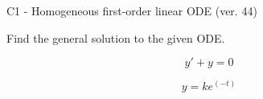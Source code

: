 \begin{exercise}
  \begin{exerciseTitle}C1 - Homogeneous first-order linear ODE (ver. 44)\end{exerciseTitle}
  \begin{exerciseStatement}
    
Find the general solution to the given ODE.

    
\[y'+y=0\]

  \end{exerciseStatement}
  \begin{exerciseAnswer}
    
\[y= k e^{\left(-t\right)}\]

  \end{exerciseAnswer}
\end{exercise}